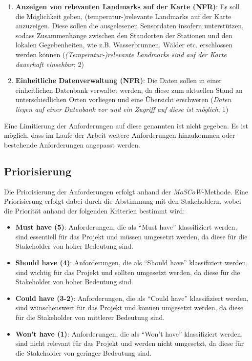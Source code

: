 \begin{enumerate}
    \item \textbf{Anzeigen von relevanten Landmarks auf der Karte (NFR)}: Es soll die Möglichkeit geben, (temperatur-)relevante Landmarks auf der Karte anzuzeigen. Diese sollen die ausgelesenen Sensordaten insofern unterstützen, sodass Zusammenhänge zwischen den Standorten der Stationen und den lokalen Gegebenheiten, wie z.B. Wasserbrunnen, Wälder etc. erschlossen werden können (\textit{(Temperatur-)relevante Landmarks sind auf der Karte dauerhaft einsehbar}; 2)
    \item \textbf{Einheitliche Datenverwaltung (NFR)}: Die Daten sollen in einer einheitlichen Datenbank verwaltet werden, da diese zum aktuellen Stand an unterschiedlichen Orten vorliegen und eine Übersicht erschweren (\textit{Daten liegen auf einer Datenbank vor und ein Zugriff auf diese ist möglich}; 1)
\end{enumerate}

Eine Limitierung der Anforderungen auf diese genannten ist nicht gegeben. Es ist möglich, dass im Laufe der Arbeit weitere Anforderungen hinzukommen oder bestehende Anforderungen angepasst werden.

\subsection{Priorisierung}
Die Priorisierung der Anforderungen erfolgt anhand der \textit{MoSCoW}-Methode. Eine Priorisierung erfolgt dabei durch die Abstimmung mit den Stakeholdern, wobei die Priorität anhand der folgenden Kriterien bestimmt wird:

\begin{itemize}
    \item \textbf{Must have (5)}: Anforderungen, die als \enquote{Must have} klassifiziert werden, sind essentiell für das Projekt und müssen umgesetzt werden, da diese für die Stakeholder von hoher Bedeutung sind.
    \item \textbf{Should have (4)}: Anforderungen, die als \enquote{Should have} klassifiziert werden, sind wichtig für das Projekt und sollten umgesetzt werden, da diese für die Stakeholder von hoher Bedeutung sind.
    \item \textbf{Could have (3-2)}: Anforderungen, die als \enquote{Could have} klassifiziert werden, sind wünschenswert für das Projekt und können umgesetzt werden, da diese für die Stakeholder von mittlerer Bedeutung sind.
    \item \textbf{Won't have (1)}: Anforderungen, die als \enquote{Won't have} klassifiziert werden, sind nicht relevant für das Projekt und werden nicht umgesetzt, da diese für die Stakeholder von geringer Bedeutung sind.
\end{itemize}


